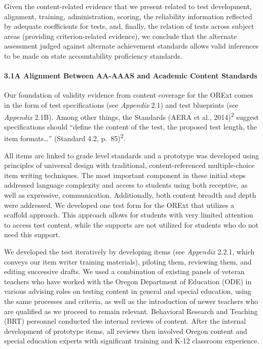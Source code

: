 \documentclass[]{article}
\let\oldparagraph\paragraph
\renewcommand{\paragraph}[1]{\oldparagraph{#1}\mbox{}}
\begin{document}
Given the content-related evidence that we present related to test
development, alignment, training, administration, scoring, the
reliability information reflected by adequate coefficients for tests,
and, finally, the relation of tests across subject areas (providing
criterion-related evidence), we conclude that the alternate assessment
judged against alternate achievement standards allows valid inferences
to be made on state accountability proficiency standards.

\paragraph{3.1A Alignment Between AA-AAAS and Academic Content
Standards}\label{a-alignment-between-aa-aaas-and-academic-content-standards}

Our foundation of validity evidence from content coverage for the ORExt
comes in the form of test specifications (see \emph{Appendix} 2.1) and
test blueprints (see \emph{Appendix} 2.1B). Among other things, the
Standards (AERA et al., 2014)\textsuperscript{2} suggest specifications
should ``define the content of the test, the proposed test length, the
item formats\ldots{}'' (Standard 4.2, p.~85)\textsuperscript{2}.

All items are linked to grade level standards and a prototype was
developed using principles of universal design with traditional,
content-referenced multiple-choice item writing techniques. The most
important component in these initial steps addressed language complexity
and access to students using both receptive, as well as expressive,
communication. Additionally, both content breadth and depth were
addressed. We developed one test form for the ORExt that utilizes a
scaffold approach. This approach allows for students with very limited
attention to access test content, while the supports are not utilized
for students who do not need this support.

We developed the test iteratively by developing items (see
\emph{Appendix} 2.2.1, which conveys our item writer training
materials), piloting them, reviewing them, and editing successive
drafts. We used a combination of existing panels of veteran teachers who
have worked with the Oregon Department of Education (ODE) in various
advising roles on testing content in general and special education,
using the same processes and criteria, as well as the introduction of
newer teachers who are qualified as we proceed to remain relevant.
Behavioral Research and Teaching (BRT) personnel conducted the internal
reviews of content. After the internal development of prototype items,
all reviews then involved Oregon content and special education experts
with significant training and K-12 classroom experience.
\end{document}
